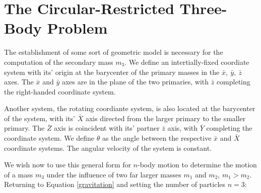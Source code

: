 \section{The Circular-Restricted Three-Body Problem}

The establishment of some sort of geometric model is necessary for the computation of the secondary mass $m_3$. We define an intertially-fixed coordiate system with its' origin at the barycenter of the primary masses \citep{Mains1993} in the $\bar x,~\bar y,~\bar z$ axes. The $\bar x$ and $\bar y$ axes are in the plane of the two primaries, with $\bar z$ completing the right-handed coordinate system. 

Another system, the rotating coordiante system, is also located at the barycenter of the system, with its' $\bar X$ axis directed from the larger primary to the smaller primary. The $\bar Z$ axis is coincident with its' partner $\bar z$ axis, with $\bar Y$ completing the coordinate system. We define $\theta$ as the angle between the respective $\bar x$ and $\bar X$ coordinate systems. The angular velocity of the system is constant.


\begin{Figure}
\centering
{}
\label{f:coordinatesystem}
\end{Figure}

We wish now to use this general form for $n$-body motion to determine the motion of a mass $m_3$ under the influence of two far larger masses $m_1$ and $m_2$, $m_1 > m_2$. Returning to Equation \ref{gravitation} and setting the number of particles $n=3$:

